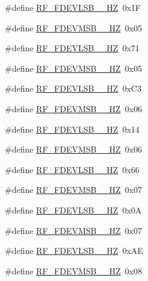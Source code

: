 \begin{DoxyCompactItemize}
\item 
\#define \mbox{\hyperlink{sx1276_regs-_fsk_8h_a28c9def64a8f7e81619124df236fb932}{R\+F\+\_\+\+F\+D\+E\+V\+L\+S\+B\+\_\+\_\+\+HZ}}~0x1F
\item 
\#define \mbox{\hyperlink{sx1276_regs-_fsk_8h_a357181556a2104789f589fa736b3fbad}{R\+F\+\_\+\+F\+D\+E\+V\+M\+S\+B\+\_\+\_\+\+HZ}}~0x05
\item 
\#define \mbox{\hyperlink{sx1276_regs-_fsk_8h_abd3148b49d4c38af8373bd6915742f61}{R\+F\+\_\+\+F\+D\+E\+V\+L\+S\+B\+\_\+\_\+\+HZ}}~0x71
\item 
\#define \mbox{\hyperlink{sx1276_regs-_fsk_8h_a61741067e7b6adeb71872ead6d569729}{R\+F\+\_\+\+F\+D\+E\+V\+M\+S\+B\+\_\+\_\+\+HZ}}~0x05
\item 
\#define \mbox{\hyperlink{sx1276_regs-_fsk_8h_a7b621f874a4cde1cff39524f75238242}{R\+F\+\_\+\+F\+D\+E\+V\+L\+S\+B\+\_\+\_\+\+HZ}}~0x\+C3
\item 
\#define \mbox{\hyperlink{sx1276_regs-_fsk_8h_aac385ea95089fd15f02ee9c6ae3f544b}{R\+F\+\_\+\+F\+D\+E\+V\+M\+S\+B\+\_\+\_\+\+HZ}}~0x06
\item 
\#define \mbox{\hyperlink{sx1276_regs-_fsk_8h_a4a3332dcc3410ea042aefd3ea508747c}{R\+F\+\_\+\+F\+D\+E\+V\+L\+S\+B\+\_\+\_\+\+HZ}}~0x14
\item 
\#define \mbox{\hyperlink{sx1276_regs-_fsk_8h_a7f10de16347c046343a2290d5b4b9746}{R\+F\+\_\+\+F\+D\+E\+V\+M\+S\+B\+\_\+\_\+\+HZ}}~0x06
\item 
\#define \mbox{\hyperlink{sx1276_regs-_fsk_8h_ad5473d95050cf0c240839957bf60cec6}{R\+F\+\_\+\+F\+D\+E\+V\+L\+S\+B\+\_\+\_\+\+HZ}}~0x66
\item 
\#define \mbox{\hyperlink{sx1276_regs-_fsk_8h_a12c35c728c8d629f7295578c715b79a8}{R\+F\+\_\+\+F\+D\+E\+V\+M\+S\+B\+\_\+\_\+\+HZ}}~0x07
\item 
\#define \mbox{\hyperlink{sx1276_regs-_fsk_8h_a4eba5e680962adb0864eb8635768fdc6}{R\+F\+\_\+\+F\+D\+E\+V\+L\+S\+B\+\_\+\_\+\+HZ}}~0x0A
\item 
\#define \mbox{\hyperlink{sx1276_regs-_fsk_8h_a37ae271366c80441c6d8c2f1e35ea29c}{R\+F\+\_\+\+F\+D\+E\+V\+M\+S\+B\+\_\+\_\+\+HZ}}~0x07
\item 
\#define \mbox{\hyperlink{sx1276_regs-_fsk_8h_ab5e21d861dfe48c74e13672bfaa53fe1}{R\+F\+\_\+\+F\+D\+E\+V\+L\+S\+B\+\_\+\_\+\+HZ}}~0x\+AE
\item 
\#define \mbox{\hyperlink{sx1276_regs-_fsk_8h_a63df078ca72c89cfb75b17b10c3b945a}{R\+F\+\_\+\+F\+D\+E\+V\+M\+S\+B\+\_\+\_\+\+HZ}}~0x08

\end{DoxyCompactItemize}
